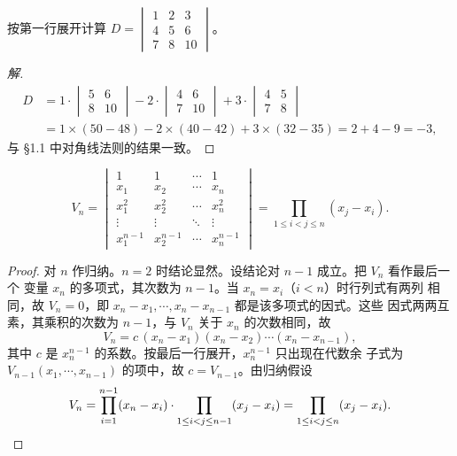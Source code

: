 \begin{example}\label{ex:expand-3}
按第一行展开计算
$D=\begin{vmatrix} 1 & 2 & 3 \\ 4 & 5 & 6 \\ 7 & 8 & 10 \end{vmatrix}$。
\end{example}
\begin{proof}[解]
\begin{align*}
  D &= 1\cdot\begin{vmatrix} 5 & 6 \\ 8 & 10 \end{vmatrix}
      -2\cdot\begin{vmatrix} 4 & 6 \\ 7 & 10 \end{vmatrix}
      +3\cdot\begin{vmatrix} 4 & 5 \\ 7 & 8 \end{vmatrix} \\
    &= 1\times(50-48)-2\times(40-42)+3\times(32-35)
     = 2+4-9=-3,
\end{align*}
与 \S 1.1 中对角线法则的结果一致。
\end{proof}

\begin{theorem}[范德蒙德行列式]\label{thm:vandermonde}
\[
  V_n=\begin{vmatrix}
    1      & 1      & \cdots & 1      \\
    x_1    & x_2    & \cdots & x_n    \\
    x_1^2  & x_2^2  & \cdots & x_n^2  \\
    \vdots & \vdots & \ddots & \vdots \\
    x_1^{n-1} & x_2^{n-1} & \cdots & x_n^{n-1}
  \end{vmatrix}
  =\prod_{1\le i<j\le n}(x_j-x_i).
\]
\end{theorem}
\begin{proof}
对 $n$ 作归纳。$n=2$ 时结论显然。设结论对 $n-1$ 成立。把 $V_n$ 看作最后一个
变量 $x_n$ 的多项式，其次数为 $n-1$。当 $x_n=x_i$（$i<n$）时行列式有两列
相同，故 $V_n=0$，即 $x_n-x_1,\cdots,x_n-x_{n-1}$ 都是该多项式的因式。这些
因式两两互素，其乘积的次数为 $n-1$，与 $V_n$ 关于 $x_n$ 的次数相同，故
\[
  V_n=c\,(x_n-x_1)(x_n-x_2)\cdots(x_n-x_{n-1}),
\]
其中 $c$ 是 $x_n^{n-1}$ 的系数。按最后一行展开，$x_n^{n-1}$ 只出现在代数余
子式为 $V_{n-1}(x_1,\cdots,x_{n-1})$ 的项中，故 $c=V_{n-1}$。由归纳假设
\[
  V_n=\prod_{i=1}^{n-1}(x_n-x_i)\cdot\prod_{1\le i<j\le n-1}(x_j-x_i)
     =\prod_{1\le i<j\le n}(x_j-x_i). \qedhere
\]
\end{proof}

